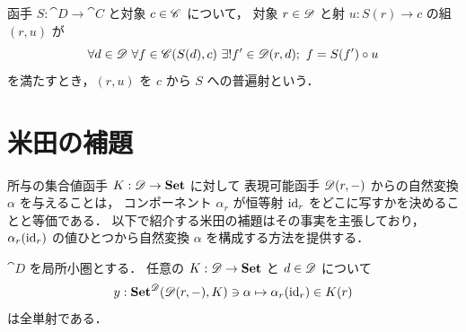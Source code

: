 \documentclass[titlepage]{ltjsreport}
\newtheorem[S]{theorem}{定理}[chapter]
\newtheorem[S]{definition}[theorem]{定義}
\newtheorem[S]{example}[theorem]{例}
\begin{document}
\begin{definition}[普遍射-2]
  函手 $S:\cat{D}\to\cat{C}$ と対象 $c\in\mathscr{C}$ について，
  対象 $r\in\mathscr{D}$ と射 $u:S(r)\to c$ の組 $(r,u)$ が
  \begin{equation}
    \forall d\in\mathscr{D}\ \forall f\in\mathscr{C}(S(d),c)
    \ \exists!f'\in\mathscr{D}(r,d);\ f=S(f')\circ u
  \end{equation}
  を満たすとき，$(r,u)$ を $c$ から $S$ への普遍射という．
\end{definition}

\section{米田の補題}

所与の集合値函手 $K:\mathscr{D}\to\mathbf{Set}$ に対して
表現可能函手 $\mathscr{D}(r,-)$ からの自然変換 $\alpha$ を与えることは，
コンポーネント $\alpha_r$ が恒等射 $\mathrm{id}_{r}$
をどこに写すかを決めることと等価である．
以下で紹介する米田の補題はその事実を主張しており，
$\alpha_r(\mathrm{id}_{r})$ の値ひとつから自然変換 $\alpha$ を構成する方法を提供する．

\begin{theorem}[米田の補題]
  $\cat{D}$ を局所小圏とする．
  任意の $K:\mathscr{D}\to\mathbf{Set}$ と $d\in\mathscr{D}$ について
  \begin{equation}
    y:\mathbf{Set}^{\mathscr{D}}(\mathscr{D}(r,-),K)\ni\alpha\mapsto\alpha_r(\mathrm{id}_{r})\in K(r)
  \end{equation}
  は全単射である．
\end{theorem}
\end{document}
